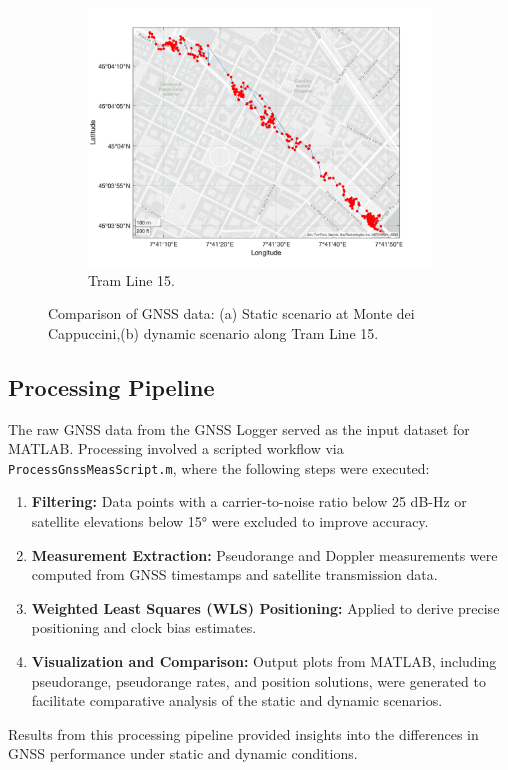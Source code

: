 \begin{figure}[h!]
\begin{subfigure}{0.23\textwidth}
              \includegraphics[width=\textwidth]{images/Tram_15_trip_Castello_to_Pescatore/filtered/Samsung_A51_Tram_15_trip_Castello_to_Pescatore_fig6.png}
              \caption{Tram Line 15.}
              \label{fig:dynamic_scenario}
          \end{subfigure}
          \vspace{0.35cm}
          \caption{Comparison of GNSS data: (a) Static scenario at Monte dei Cappuccini,(b) dynamic scenario along Tram Line 15.}
          \label{fig:gnss_comparison}
        \end{figure}

    \subsection{Processing Pipeline}
    
        The raw GNSS data from the GNSS Logger served as the input dataset for MATLAB. 
        Processing involved a scripted workflow via \texttt{ProcessGnssMeasScript.m}, where the following steps were executed:
        
        \begin{enumerate}
            \item \textbf{Filtering:} Data points with a carrier-to-noise ratio below 25 dB-Hz or satellite elevations below 15° were excluded to improve accuracy.
            \item \textbf{Measurement Extraction:} Pseudorange and Doppler measurements were computed from GNSS timestamps and satellite transmission data.
            \item \textbf{Weighted Least Squares (WLS) Positioning:} Applied to derive precise positioning and clock bias estimates.
            \item \textbf{Visualization and Comparison:} Output plots from MATLAB, including pseudorange, pseudorange rates, and position solutions, were generated to facilitate comparative analysis of the static and dynamic scenarios.
        \end{enumerate}

        Results from this processing pipeline provided insights into the differences in GNSS performance under static and dynamic conditions.
    